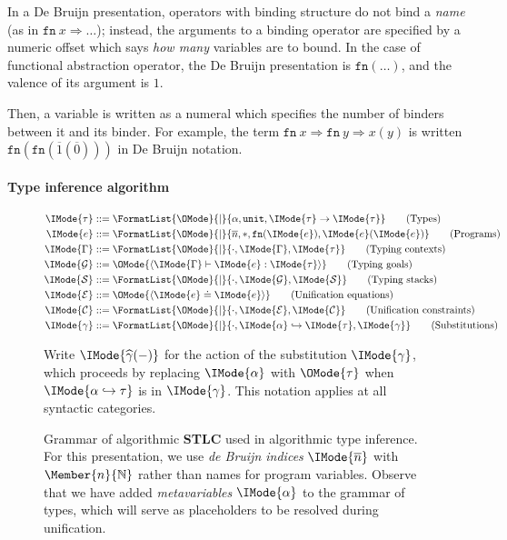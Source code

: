 \documentclass[twocolumn,9pt]{article}
\theoremstyle{definition}
\theoremstyle{remark}
\numberwithin{equation}{section}
\newcommand\Nat{\mathbb{N}}
\newcommand\STLC{{\sffamily\bfseries{}STLC}}
\newcommand\Nil{*}
\newcommand\Fn[2]{\mathtt{fn}\ {#1}\Rightarrow{#2}}
\newcommand\DBFn[1]{\mathtt{fn} (#1)}
\newcommand\TyUnit{\mathtt{unit}}
\newcommand\TyArr[2]{#1\to{#2}}
\newcommand\Var[1]{\overline{#1}}
\newcommand\MkGoal[3]{\langle{#1}\vdash{#2}:{#3}\rangle}
\newcommand\MkEq[2]{\langle{#1}\doteq{#2}\rangle}
\newcommand\Subst[2]{\widehat{#1} (#2)}
\begin{document}
In a De Bruijn presentation, operators with binding structure do not
bind a \emph{name} (as in $\Fn{x}{\ldots}$); instead, the arguments to
a binding operator are specified by a numeric offset which says
\emph{how many} variables are to bound. In the case of functional
abstraction operator, the De Bruijn presentation is $\DBFn{\ldots}$,
and the valence of its argument is $1$.

Then, a variable is written as a numeral which specifies the number of
binders between it and its binder. For example, the term
$\Fn{x}{\Fn{y}{x(y)}}$ is written
$\DBFn{\DBFn{\overline{1}(\overline{0})}}$ in De Bruijn notation.

\paragraph{Type inference algorithm}



\begin{figure*}
  \begin{align*}
    \IMode{\tau} &::= \FormatList{\OMode}{\mid}{\alpha, \TyUnit,\TyArr{\IMode{\tau}}{\IMode{\tau}}}
    \tag{Types}
    \\
    \IMode{e} &::= \FormatList{\OMode}{\mid}{\Var{n}, \Nil, \DBFn{\IMode{e}}, \IMode{e}(\IMode{e})}
    \tag{Programs}
    \\
    \IMode{\Gamma} &::= \FormatList{\OMode}{\mid}{\cdot,{\IMode{\Gamma},\IMode{\tau}}}
    \tag{Typing contexts}
    \\
    \IMode{\mathcal{G}} &::= \OMode{\MkGoal{\IMode{\Gamma}}{\IMode{e}}{\IMode{\tau}}}
    \tag{Typing goals}
    \\
    \IMode{\mathcal{S}} &::= \FormatList{\OMode}{\mid}{\cdot, {\IMode{\mathcal{G}},\IMode{\mathcal{S}}}}
    \tag{Typing stacks}
    \\
    \IMode{\mathcal{E}} &::= \OMode{\MkEq{\IMode{e}}{\IMode{e}}}
    \tag{Unification equations}
    \\
    \IMode{\mathcal{C}} &::= \FormatList{\OMode}{\mid}{\cdot,{\IMode{\mathcal{E}},\IMode{\mathcal{C}}}}
    \tag{Unification constraints}
    \\
    \IMode{\gamma} &::= \FormatList{\OMode}{\mid}{\cdot, {\IMode{\alpha}\hookrightarrow\IMode{\tau},\IMode{\gamma}}}
    \tag{Substitutions}
  \end{align*}

  Write $\IMode{\Subst{\gamma}{-}}$ for the action of the substitution
  $\IMode{\gamma}$, which proceeds by replacing $\IMode{\alpha}$ with
  $\OMode{\tau}$ when $\IMode{\alpha\hookrightarrow\tau}$ is in
  $\IMode{\gamma}$. This notation applies at all syntactic categories.

  \caption{Grammar of algorithmic \STLC{} used in algorithmic type
    inference.  For this presentation, we use \emph{de Bruijn indices}
    $\IMode{\Var{n}}$ with $\Member{n}{\Nat}$ rather than names for
    program variables. Observe that we have added \emph{metavariables}
    $\IMode{\alpha}$ to the grammar of types, which will serve as
    placeholders to be resolved during unification.
  }\label{fig:stlc-algorithmic-grammar}
\end{figure*}
\end{document}

